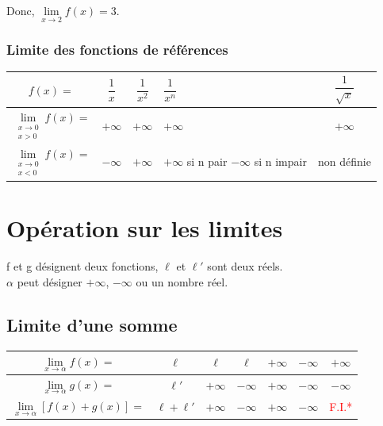\documentclass[a4paper,12pt,twoside,french]{extarticle}
\begin{document}
  Donc, $\lim\limits_{x \rightarrow 2} f(x)= 3$.\\
  
  
  
   \subsubsection{Limite des fonctions de références}
   
   
   \vspace*{0.5cm}
   
   \renewcommand{\arraystretch}{2}
   
   \begin{tabular}{|c|c|c|p{2.5cm}|c|}
   \hline 
  \cellcolor{lightgray} $f(x)=$ & \cellcolor{lightgray}  $\dfrac{1}{x}$  &  \cellcolor{lightgray}  $\dfrac{1}{x^2}$ &\cellcolor{lightgray}  $\dfrac{1}{x^n}$ & \cellcolor{lightgray}  $\dfrac{1}{\sqrt{x}}$ \\ 
   \hline 
  \cellcolor{lightgray}  $\lim\limits_{\substack{x \rightarrow 0 \\ x>0}} f(x) = $ & $+\infty$ &  $+\infty$ & $+\infty$ & $+\infty$   \\ 
   \hline 
  \cellcolor{lightgray}   $\lim\limits_{\substack{x \rightarrow 0 \\ x<0}} f(x) = $ & $-\infty$ & $+\infty$ & $+\infty$ si n pair $-\infty$ si n impair  & non définie \\ 
   \hline 
   \end{tabular} 
   

 \section{Opération sur les limites}
 
f et g désignent deux fonctions, $\ell$ et $\ell'$ sont deux réels.\\
  $\alpha$ peut désigner $+\infty$, $-\infty$ ou un nombre réel.
 
 \subsection{Limite d'une somme}
 
 \begin{tabular}{|c|c|c|c|c|c|c|}
 \hline 
 $\lim\limits_{x \rightarrow \alpha} f(x)=$ & $\ell$ & $\ell$ & $\ell$ &  $+\infty$ &  $-\infty$ & \cellcolor{yellow} $+\infty$ \\ 
 \hline 
 $\lim\limits_{x \rightarrow \alpha} g(x)=$ & $\ell'$ & $+\infty$ &  $-\infty$ &  $+\infty$ & $-\infty$  &\cellcolor{yellow} $-\infty$  \\ 
 \hline 
 $\lim\limits_{x \rightarrow \alpha} [f(x)+g(x)]=$ & $\ell+ \ell'$ & $+\infty$ &  $-\infty$ &  $+\infty$ & $-\infty$ &\cellcolor{yellow} \textcolor{red}{F.I.*}\\ 
 \hline 
 \end{tabular} 
 \vspace*{0.25cm}
 
\end{document}
